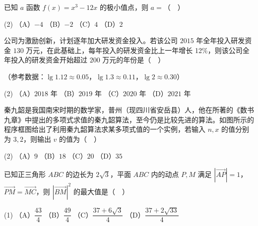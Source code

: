 \begin{question}
已知 \(a\) 函数 \(f(x)=x^{3}-12x\) 的极小值点，则 \(a=\)（　）

\begin{gkopts}(2)
\task （A）\(-4\)
\task （B）\(-2\)
\task （C）\(4\)
\task （D）\(2\)
\end{gkopts}

\end{question}
\begin{question}
公司为激励创新，计划逐年加大研发资金投入。若该公司 \(2015\) 年全年投入研发资金 \(130\) 万元，在此基础上，每年投入的研发资金比上一年增长 12\%，则该公司全年投入的研发资金开始超过 \(200\) 万元的年份是（　）

（参考数据：\(\lg 1.12\approx 0.05\)，\(\lg 1.3\approx 0.11\)，\(\lg 2\approx 0.30\)）

\begin{gkopts}(2)
\task （A）\(2018\) 年
\task （B）\(2019\) 年
\task （C）\(2020\) 年
\task （D）\(2021\) 年
\end{gkopts}

\Needspace{0.4\textheight}
\end{question}
\begin{question}
秦九韶是我国南宋时期的数学家，普州（现四川省安岳县）人，他在所著的《数书九章》中提出的多项式求值的秦九韶算法，至今仍是比较先进的算法。如图所示的程序框图给出了利用秦九韶算法求某多项式值的一个实例，若输入 \(n,x\) 的值分别为 \(3,2\)，则输出 \(v\) 的值为（　）
\nopagebreak[4]
\begin{center}\end{center}
\nopagebreak[4]
\begin{gkopts}(2)
\task （A）\(9\)
\task （B）\(18\)
\task （C）\(20\)
\task （D）\(35\)
\end{gkopts}

\end{question}
\begin{question}
已知正三角形 \(ABC\) 的边长为 \(2\sqrt{3}\)，平面 \(ABC\) 内的动点 \(P,M\) 满足 \(\left|\overrightarrow{AP}\right|=1\)，\(\overrightarrow{PM}=\overrightarrow{MC}\)，则 \(\left|\overrightarrow{BM}\right|^{2}\) 的最大值是（　）

\begin{gkopts}(1)
\task （A）\(\dfrac{43}{4}\)
\task （B）\(\dfrac{49}{4}\)
\task （C）\(\dfrac{37+6\sqrt{3}}{4}\)
\task （D）\(\dfrac{37+2\sqrt{33}}{4}\)
\end{gkopts}

\end{question}

